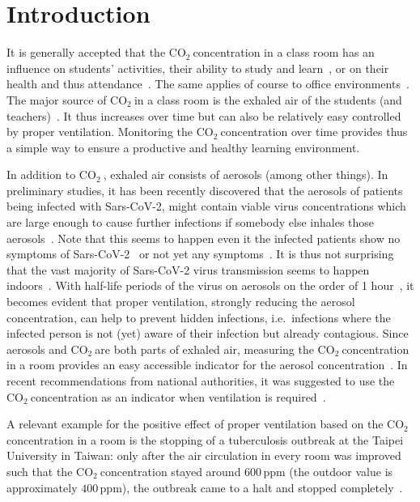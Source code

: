 \documentclass[12pt,a4paper]{article}
\newcommand{\coo}{\ensuremath{\mathrm{CO_2}~}}
\begin{document}
\section{Introduction}\label{s:intro}
It is generally accepted that the \coo concentration in a class room has an influence on students' activities, their ability to study and learn~\cite{TWARDELLA2012,GAIHRE2014}, or on their health and thus attendance~\cite{SHENDELL2004}. The same applies of course to office environments~\cite{ALLEN2016}. The major source of \coo in a class room is the exhaled air of the students (and teachers)~\cite{PERSILY2017}. It thus increases over time but can also be relatively easy controlled by proper ventilation. Monitoring the \coo concentration over time provides thus a simple way to ensure a productive and healthy learning environment. 

In addition to \coo, exhaled air consists of aerosols (among other things). In preliminary studies, it has been recently discovered that the aerosols of patients being infected with Sars-CoV-2, might contain viable virus concentrations which are large enough to cause further infections if somebody else inhales those aerosols~\cite{LEDNICKY2020,MORAWSKA2020,KOHANSKI2020}. Note that this seems to happen even it the infected patients show no symptoms of Sars-CoV-2~\cite{FURUKAWA2020} or not yet any symptoms~\cite{SUN2020}. It is thus not surprising that the vast majority of Sars-CoV-2 virus transmission seems to happen indoors~\cite{QIAN2020}. With half-life periods of the virus on aerosols on the order of 1 hour~\cite{DOREMALEN2020}, it becomes evident that proper ventilation, strongly reducing the aerosol concentration, can help to prevent hidden infections, i.e.\ infections where the infected person is not (yet) aware of their infection but already contagious. Since aerosols and \coo are both parts of exhaled air, measuring the \coo concentration in a room provides an easy accessible indicator for the aerosol concentration~\cite{HARTMANN2020}. In recent recommendations from national authorities, it was suggested to use the \coo concentration as an indicator when ventilation is required~\cite{VOSS2020,BMA2020a,RKI2020}.

A relevant example for the positive effect of proper ventilation based on the \coo concentration in a room is the stopping of a tuberculosis outbreak at the Taipei University in Taiwan: only after the air circulation in every room was improved such that the \coo concentration stayed around $600\,\mathrm{ppm}$ (the outdoor value is approximately $400\,\mathrm{ppm}$), the outbreak came to a halt and stopped completely~\cite{DU2020}.
\end{document}

